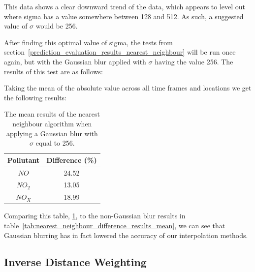
			This data shows a clear downward trend of the data, which appears to level out where sigma has a value somewhere between 128 and 512. As such, a suggested value of $\sigma$ would be 256. 

			After finding this optimal value of sigma, the tests from section~\ref{prediction_evaluation_results_nearest_neighbour} will be run once again, but with the Gaussian blur applied with $\sigma$ having the value 256. The results of this test are as follows:


			Taking the mean of the absolute value across all time frames and locations we get the following results:

			\begin{table}[H]
				\centering
	    		\begin{tabular}{|c|c|}
	    			\hline
					Pollutant & Difference (\%) \\ \hline
					$NO$ & 24.52 \\
					$NO_{2}$ & 13.05 \\
					$NO_{X}$ & 18.99 \\
					\hline 
				\end{tabular}
				\caption{The mean results of the nearest neighbour algorithm when applying a Gaussian blur with $\sigma$ equal to 256.}
				\label{tab:nearest_neighbour_convolution_results}
			\end{table}

			Comparing this table, \ref{tab:nearest_neighbour_convolution_results}, to the non-Gaussian blur results in table~\ref{tab:nearest_neighbour_difference_results_mean}, we can see that Gaussian blurring has in fact lowered the accuracy of our interpolation methods. 

        \subsection{Inverse Distance Weighting}\label{prediction_evaluation_results_inverse_distance_weighting}


